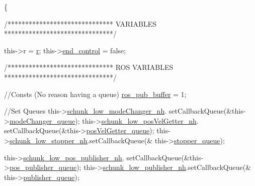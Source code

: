 \begin{DoxyCode}
                                                                               
                                       \{

        \textcolor{comment}{/******************************}
\textcolor{comment}{                 VARIABLES}
\textcolor{comment}{        *******************************/}

        this->r = \hyperlink{classCartesian__controller_a5562129951bd802e4ded77fc716c87a0}{r};
        this->\hyperlink{classCartesian__controller_a3c0a72214891f68e2bad63bf2b688f9c}{end\_control} = \textcolor{keyword}{false};

        \textcolor{comment}{/******************************}
\textcolor{comment}{                  ROS VARIABLES}
\textcolor{comment}{        *******************************/}

        \textcolor{comment}{//Consts (No reason having a queue)}
        \hyperlink{classCartesian__controller_ab9ed5a808da204dbc612d313dc7332f4}{ros\_pub\_buffer} = 1;

        \textcolor{comment}{//Set Queues}
        this->\hyperlink{classCartesian__controller_ad90134b232217e84cb58137a9d2030bb}{schunk\_low\_modeChanger\_nh}.
      setCallbackQueue(&this->\hyperlink{classCartesian__controller_adf47dc3a09bd9650015b25870054b60d}{modeChanger\_queue});
        this->\hyperlink{classCartesian__controller_aeed01809bd5240663c7acfade245a386}{schunk\_low\_posVelGetter\_nh}.
      setCallbackQueue(&this->\hyperlink{classCartesian__controller_a144c7faad45f3d070624452c1f02ba15}{posVelGetter\_queue});
        this->\hyperlink{classCartesian__controller_a57b1869ec960e75e435e1f882a02d80e}{schunk\_low\_stopper\_nh}.setCallbackQueue(&
      this->\hyperlink{classCartesian__controller_a52eb090400d8dafaa22aecb037788a66}{stopper\_queue});

        this->\hyperlink{classCartesian__controller_aabe48e7ab08b0235d4cd94213b8faf5d}{schunk\_low\_pos\_publisher\_nh}.
      setCallbackQueue(&this->\hyperlink{classCartesian__controller_adbb9cddf4092cba9042294740c5371eb}{pos\_publisher\_queue});
        this->\hyperlink{classCartesian__controller_a7df4ce63bf0551bfa7061bc718cd68d2}{schunk\_low\_publisher\_nh}.setCallbackQueue(&
      this->\hyperlink{classCartesian__controller_a041a2eb6657c9b036a512fb21e9f5086}{publisher\_queue});


\end{DoxyCode}

